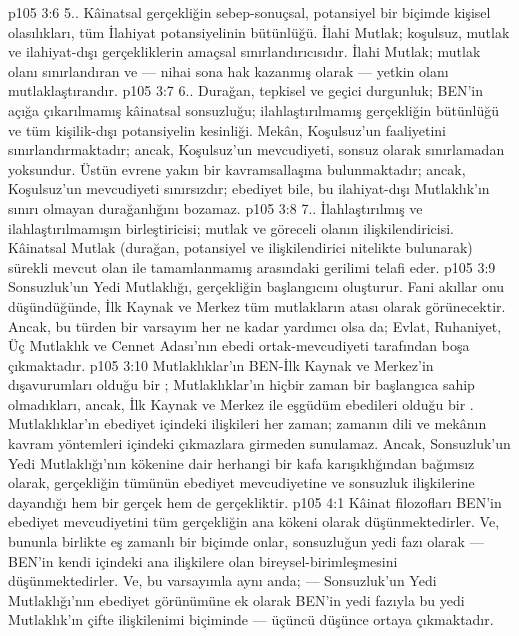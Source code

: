 \vs p105 3:6 5.. Kâinatsal gerçekliğin sebep\hyp{}sonuçsal, potansiyel bir biçimde kişisel olasılıkları, tüm İlahiyat potansiyelinin bütünlüğü. İlahi Mutlak; koşulsuz, mutlak ve ilahiyat\hyp{}dışı gerçekliklerin amaçsal sınırlandırıcısıdır. İlahi Mutlak; mutlak olanı sınırlandıran ve --- nihai sona hak kazanmış olarak --- yetkin olanı mutlaklaştırandır.
\vs p105 3:7 6.\bibnobreakspace {}. Durağan, tepkisel ve geçici durgunluk; BEN’in açığa çıkarılmamış kâinatsal sonsuzluğu; ilahlaştırılmamış gerçekliğin bütünlüğü ve tüm kişilik\hyp{}dışı potansiyelin kesinliği. Mekân, Koşulsuz’un faaliyetini sınırlandırmaktadır; ancak, Koşulsuz’un mevcudiyeti, sonsuz olarak sınırlamadan yoksundur. Üstün evrene yakın bir kavramsallaşma bulunmaktadır; ancak, Koşulsuz’un mevcudiyeti sınırsızdır; ebediyet bile, bu ilahiyat\hyp{}dışı Mutlaklık’ın sınırı olmayan durağanlığını bozamaz.
\vs p105 3:8 7.\bibnobreakspace {}. İlahlaştırılmış ve ilahlaştırılmamışın birleştiricisi; mutlak ve göreceli olanın ilişkilendiricisi. Kâinatsal Mutlak (durağan, potansiyel ve ilişkilendirici nitelikte bulunarak) sürekli mevcut olan ile tamamlanmamış arasındaki gerilimi telafi eder.
\vs p105 3:9 Sonsuzluk’un Yedi Mutlaklığı, gerçekliğin başlangıcını oluşturur. Fani akıllar onu düşündüğünde, İlk Kaynak ve Merkez tüm mutlakların atası olarak görünecektir. Ancak, bu türden bir varsayım her ne kadar yardımcı olsa da; Evlat, Ruhaniyet, Üç Mutlaklık ve Cennet Adası’nın ebedi ortak\hyp{}mevcudiyeti tarafından boşa çıkmaktadır.
\vs p105 3:10 Mutlaklıklar’ın BEN\hyp{}İlk Kaynak ve Merkez’in dışavurumları olduğu bir ; Mutlaklıklar’ın hiçbir zaman bir başlangıca sahip olmadıkları, ancak, İlk Kaynak ve Merkez ile eşgüdüm ebedileri olduğu bir . Mutlaklıklar’ın ebediyet içindeki ilişkileri her zaman; zamanın dili ve mekânın kavram yöntemleri içindeki çıkmazlara girmeden sunulamaz. Ancak, Sonsuzluk’un Yedi Mutlaklığı’nın kökenine dair herhangi bir kafa karışıklığından bağımsız olarak, gerçekliğin tümünün ebediyet mevcudiyetine ve sonsuzluk ilişkilerine dayandığı hem bir gerçek hem de gerçekliktir.
\vs p105 4:1 Kâinat filozofları BEN’in ebediyet mevcudiyetini tüm gerçekliğin ana kökeni olarak düşünmektedirler. Ve, bununla birlikte eş zamanlı bir biçimde onlar, sonsuzluğun yedi fazı olarak --- BEN’in kendi içindeki ana ilişkilere olan bireysel\hyp{}birimleşmesini düşünmektedirler. Ve, bu varsayımla aynı anda; --- Sonsuzluk’un Yedi Mutlaklığı’nın ebediyet görünümüne ek olarak BEN’in yedi fazıyla bu yedi Mutlaklık’ın çifte ilişkilenimi biçiminde --- üçüncü düşünce ortaya çıkmaktadır.
